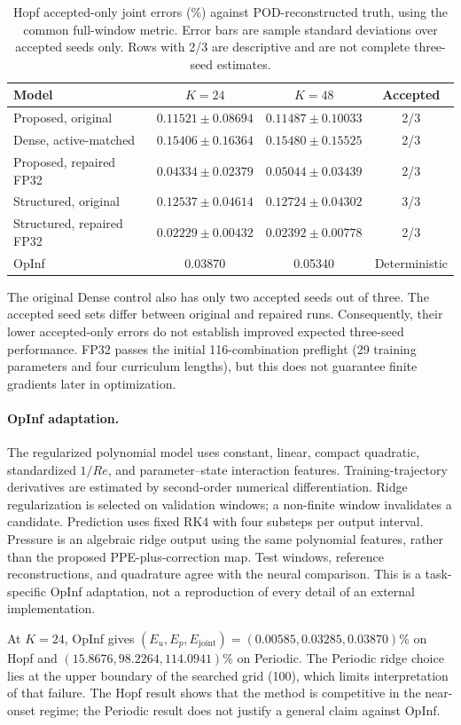 \begin{table}[H]
\centering
\caption{Hopf accepted-only joint errors (\%) against POD-reconstructed
truth, using the common full-window metric. Error bars are sample
standard deviations over accepted seeds only. Rows with 2/3 are
descriptive and are not complete three-seed estimates.}
\label{tab:hopf_accepted}
\small
\begin{tabular}{@{}lccc@{}}
\toprule
Model & $K=24$ & $K=48$ & Accepted\\
\midrule
Proposed, original & $0.11521\pm0.08694$ & $0.11487\pm0.10033$ & 2/3\\
Dense, active-matched & $0.15406\pm0.16364$ & $0.15480\pm0.15525$ & 2/3\\
Proposed, repaired FP32 & $0.04334\pm0.02379$ & $0.05044\pm0.03439$ & 2/3\\
Structured, original & $0.12537\pm0.04614$ & $0.12724\pm0.04302$ & 3/3\\
Structured, repaired FP32 & $0.02229\pm0.00432$ & $0.02392\pm0.00778$ & 2/3\\
OpInf & 0.03870 & 0.05340 & Deterministic\\
\bottomrule
\end{tabular}
\end{table}

The original Dense control also has only two accepted seeds out of three.
The accepted seed sets differ between original and repaired runs.
Consequently, their lower accepted-only errors do not establish improved
expected three-seed performance. FP32 passes the initial 116-combination
preflight (29 training parameters and four curriculum lengths), but this
does not guarantee finite gradients later in optimization.

\paragraph{OpInf adaptation.}
The regularized polynomial model uses constant, linear, compact quadratic,
standardized $1/Re$, and parameter--state interaction features.
Training-trajectory derivatives are estimated by second-order numerical
differentiation. Ridge regularization is selected on validation windows;
a non-finite window invalidates a candidate. Prediction uses fixed RK4
with four substeps per output interval. Pressure is an algebraic ridge
output using the same polynomial features, rather than the proposed
PPE-plus-correction map. Test windows, reference reconstructions, and
quadrature agree with the neural comparison. This is a task-specific
OpInf adaptation, not a reproduction of every detail of an external
implementation.

At $K=24$, OpInf gives $(E_u,E_p,E_{\mathrm{joint}})=
(0.00585,0.03285,0.03870)\%$ on Hopf and
$(15.8676,98.2264,114.0941)\%$ on Periodic.
The Periodic ridge choice lies at the upper boundary of the searched
grid (100), which limits interpretation of that failure. The Hopf result
shows that the method is competitive in the near-onset regime; the
Periodic result does not justify a general claim against OpInf.
